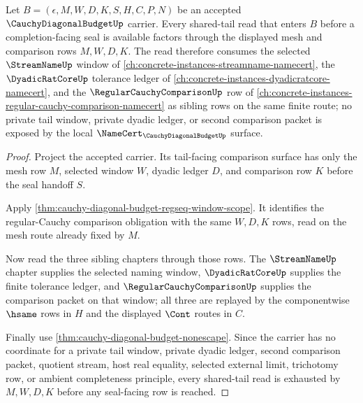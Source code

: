 \begin{theorem}
\label{thm:cauchy-diagonal-budget-shared-tail-window-exhaustion}
Let $B=(\epsilon,M,W,D,K,S,H,C,P,N)$ be an accepted $\CauchyDiagonalBudgetUp$ carrier. Every shared-tail read that enters $B$ before a completion-facing seal is available factors through the displayed mesh and comparison rows $M,W,D,K$. The read therefore consumes the selected $\StreamNameUp$ window of \autoref{ch:concrete-instances-streamname-namecert}, the $\DyadicRatCoreUp$ tolerance ledger of \autoref{ch:concrete-instances-dyadicratcore-namecert}, and the $\RegularCauchyComparisonUp$ row of \autoref{ch:concrete-instances-regular-cauchy-comparison-namecert} as sibling rows on the same finite route; no private tail window, private dyadic ledger, or second comparison packet is exposed by the local $\NameCert_{\CauchyDiagonalBudgetUp}$ surface.
\end{theorem}
\begin{proof}
Project the accepted carrier. Its tail-facing comparison surface has only the mesh row $M$, selected window $W$, dyadic ledger $D$, and comparison row $K$ before the seal handoff $S$.

Apply \autoref{thm:cauchy-diagonal-budget-regseq-window-scope}. It identifies the regular-Cauchy comparison obligation with the same $W,D,K$ rows, read on the mesh route already fixed by $M$.

Now read the three sibling chapters through those rows. The $\StreamNameUp$ chapter supplies the selected naming window, $\DyadicRatCoreUp$ supplies the finite tolerance ledger, and $\RegularCauchyComparisonUp$ supplies the comparison packet on that window; all three are replayed by the componentwise $\hsame$ rows in $H$ and the displayed $\Cont$ routes in $C$.

Finally use \autoref{thm:cauchy-diagonal-budget-nonescape}. Since the carrier has no coordinate for a private tail window, private dyadic ledger, second comparison packet, quotient stream, host real equality, selected external limit, trichotomy row, or ambient completeness principle, every shared-tail read is exhausted by $M,W,D,K$ before any seal-facing row is reached.
\end{proof}

